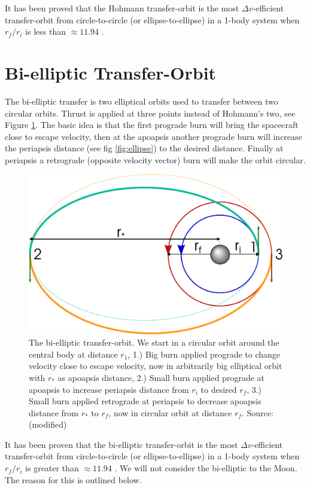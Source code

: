 It has been proved that the Hohmann transfer-orbit is the most $\Delta v$-efficient transfer-orbit from circle-to-circle (or ellipse-to-ellipse) in a 1-body system when $r_f/r_i$ is less than $\approx 11.94$ \cite{Prussing1992} \cite{Peet} \cite{Biesbroek2000}.


\section{Bi-elliptic Transfer-Orbit}
The bi-elliptic transfer is two elliptical orbits used to transfer between two circular orbits. Thrust is applied at three points instead of Hohmann's two, see Figure \ref{fig:bi-elliptical}. The basic idea is that the first prograde burn will bring the spacecraft close to escape velocity, then at the apoapsis another prograde burn will increase the periapsis distance (see fig \ref{fig:ellipse}) to the desired distance. Finally at periapsis a retrograde (opposite velocity vector) burn will make the orbit circular.

\begin{figure}[ht!]
\centering
\includegraphics[scale=0.53]{fig/bi-elliptic.pdf}
\caption{The bi-elliptic transfer-orbit. We start in a circular orbit around the central body at distance $r_1$, 1.) Big burn applied prograde to change velocity close to escape velocity, now in arbitrarily big elliptical orbit with $r_*$ as apoapsis distance, 2.) Small burn applied prograde at apoapsis to increase periapsis distance from $r_i$ to desired $r_f$, 3.) Small burn applied retrograde at periapsis to decrease apoapsis distance from $r_*$ to $r_f$, now in circular orbit at distance $r_f$. Source: \cite{fig-bi-elliptical} (modified)}
\label{fig:bi-elliptical}
\end{figure}
It has been proven that the bi-elliptic transfer-orbit is the most $\Delta v$-efficient transfer-orbit from circle-to-circle (or ellipse-to-ellipse) in a 1-body system when $r_f/r_i$ is greater than $\approx 11.94$ \cite{Prussing1992} \cite{Peet}. We will not consider the bi-elliptic to the Moon. The reason for this is outlined below.

